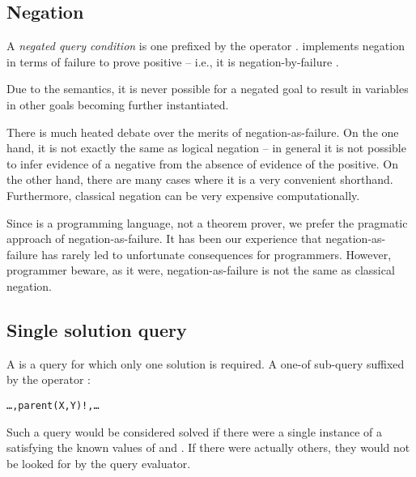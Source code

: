 \subsection{Negation}
\label{goal:negation}

A \emph{negated query condition} is one prefixed by the operator \nasf. \go implements negation in terms of failure to prove positive -- i.e., it is negation-by-failure \cite{klc:78}.

Due to the  semantics, it is never possible for a negated goal to result in variables in other goals becoming further instantiated.

\begin{aside}
There is much heated debate over the merits of negation-as-failure. On the one hand, it is not exactly the same as logical negation -- in general it is not possible to infer evidence of a negative from the absence of evidence of the positive. On the other hand, there are many cases where it is a very convenient shorthand. Furthermore, classical negation can be very expensive computationally.

Since \go is a programming language, not a theorem prover, we prefer the pragmatic approach of negation-as-failure. It has been our experience that negation-as-failure has rarely led to unfortunate consequences for programmers. However, programmer beware, as it were, negation-as-failure is not the same as classical negation.
\end{aside}

\subsection{Single solution query}
\label{goal:oneof}

A  is a query for which only one solution is required. A one-of sub-query suffixed by the operator \q{!}:
\begin{alltt}
\ldots,parent(X,Y)!,\ldots
\end{alltt}
Such a query would be considered solved if there were a single instance of a  satisfying the known values of  and . If there were actually others, they would not be looked for by the query evaluator.

